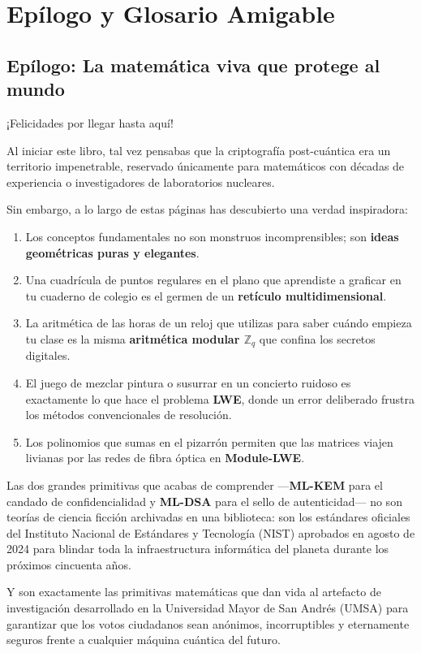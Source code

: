 \chapter{Epílogo y Glosario Amigable}
\label{cap:epilogo_glosario}

\section{Epílogo: La matemática viva que protege al mundo}

¡Felicidades por llegar hasta aquí!

Al iniciar este libro, tal vez pensabas que la criptografía post-cuántica era un territorio impenetrable, reservado únicamente para matemáticos con décadas de experiencia o investigadores de laboratorios nucleares.

Sin embargo, a lo largo de estas páginas has descubierto una verdad inspiradora:
\begin{enumerate}
  \item Los conceptos fundamentales no son monstruos incomprensibles; son \textbf{ideas geométricas puras y elegantes}.
  \item Una cuadrícula de puntos regulares en el plano que aprendiste a graficar en tu cuaderno de colegio es el germen de un \textbf{retículo multidimensional}.
  \item La aritmética de las horas de un reloj que utilizas para saber cuándo empieza tu clase es la misma \textbf{aritmética modular $\mathbb{Z}_q$} que confina los secretos digitales.
  \item El juego de mezclar pintura o susurrar en un concierto ruidoso es exactamente lo que hace el problema \textbf{LWE}, donde un error deliberado frustra los métodos convencionales de resolución.
  \item Los polinomios que sumas en el pizarrón permiten que las matrices viajen livianas por las redes de fibra óptica en \textbf{Module-LWE}.
\end{enumerate}

Las dos grandes primitivas que acabas de comprender ---\textbf{ML-KEM} para el candado de confidencialidad y \textbf{ML-DSA} para el sello de autenticidad--- no son teorías de ciencia ficción archivadas en una biblioteca: son los estándares oficiales del Instituto Nacional de Estándares y Tecnología (NIST) aprobados en agosto de 2024 para blindar toda la infraestructura informática del planeta durante los próximos cincuenta años.

Y son exactamente las primitivas matemáticas que dan vida al artefacto de investigación desarrollado en la Universidad Mayor de San Andrés (UMSA) para garantizar que los votos ciudadanos sean anónimos, incorruptibles y eternamente seguros frente a cualquier máquina cuántica del futuro.

